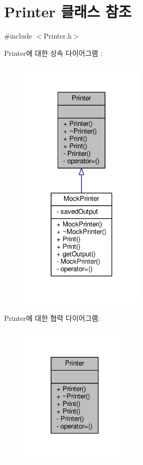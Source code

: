 \hypertarget{class_printer}{}\section{Printer 클래스 참조}
\label{class_printer}


{\ttfamily \#include $<$Printer.\+h$>$}



Printer에 대한 상속 다이어그램 \+: 
\nopagebreak
\begin{figure}[H]
\begin{center}
\leavevmode
\includegraphics[width=170pt]{class_printer__inherit__graph}
\end{center}
\end{figure}


Printer에 대한 협력 다이어그램\+:
\nopagebreak
\begin{figure}[H]
\begin{center}
\leavevmode
\includegraphics[width=150pt]{class_printer__coll__graph}
\end{center}
\end{figure}
